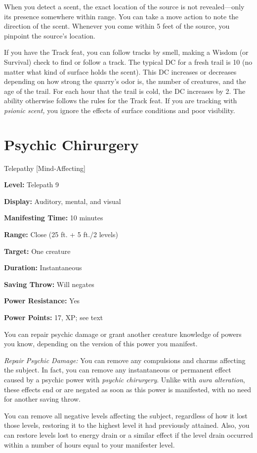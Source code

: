 \documentclass{article}
\begin{document}
When you detect a scent, the exact location of the source is not revealed---only 
its presence somewhere within range. You can take a move action to note the direction 
of the scent. Whenever you come within 5 feet of the source, you pinpoint the source's 
location.

If you have the Track feat, you can follow tracks by smell, making a Wisdom (or 
Survival) check to find or follow a track. The typical DC for a fresh trail is 
10 (no matter what kind of surface holds the scent). This DC increases or decreases 
depending on how strong the quarry's odor is, the number of creatures, and the 
age of the trail. For each hour that the trail is cold, the DC increases by 2. 
The ability otherwise follows the rules for the Track feat. If you are tracking 
with \textit{psionic scent, }you ignore the effects of surface conditions and poor 
visibility.

\vspace{12pt}
\section*{Psychic Chirurgery}

Telepathy [Mind-Affecting]

\textbf{Level:} Telepath 9

\textbf{Display:} Auditory, mental, and visual

\textbf{Manifesting Time:} 10 minutes

\textbf{Range:} Close (25 ft. + 5 ft./2 levels)

\textbf{Target:} One creature

\textbf{Duration:} Instantaneous

\textbf{Saving Throw:} Will negates

\textbf{Power Resistance:} Yes

\textbf{Power Points:} 17, XP; see text

You can repair psychic damage or grant another creature knowledge of powers you 
know, depending on the version of this power you manifest.

\textit{Repair Psychic Damage: }You can remove any compulsions and charms affecting 
the subject. In fact, you can remove any instantaneous or permanent effect caused 
by a psychic power with \textit{psychic chirurgery}. Unlike with \textit{aura alteration}, 
these effects end or are negated as soon as this power is manifested, with no need 
for another saving throw.

You can remove all negative levels affecting the subject, regardless of how it 
lost those levels, restoring it to the highest level it had previously attained. 
Also, you can restore levels lost to energy drain or a similar effect if the level 
drain occurred within a number of hours equal to your manifester level.
\end{document}
